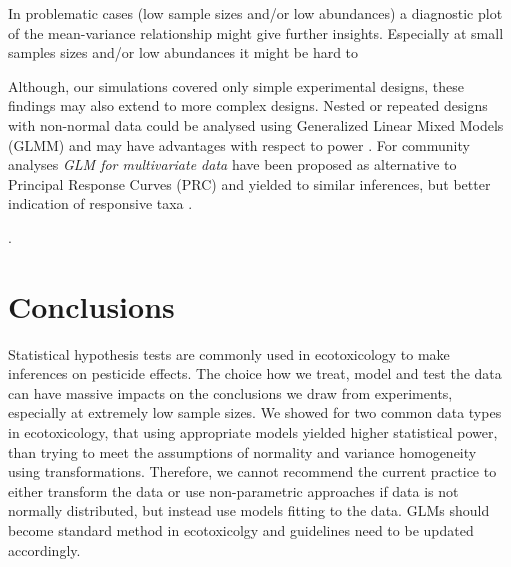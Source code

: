 \documentclass{scrartcl}
\begin{document}

In problematic cases (low sample sizes and/or low abundances) a diagnostic plot of the mean-variance relationship might give further insights.
Especially at small samples sizes and/or low abundances it might be hard to


Although, our simulations covered only simple experimental designs, these findings may also extend to more complex designs. 
Nested or repeated designs with non-normal data could be analysed using Generalized Linear Mixed Models (GLMM) and may have advantages with respect to power \citep{stroup_rethinking_2014}.
For community analyses \emph{GLM for multivariate data} have been proposed as alternative to Principal Response Curves (PRC) and yielded to similar inferences, but better indication of responsive taxa \citep{warton_distance-based_2012,szocs_analysing_2015}.





.







\newpage
\section{Conclusions}
Statistical hypothesis tests are commonly used in ecotoxicology to make inferences on pesticide effects.
The choice how we treat, model and test the data can have massive impacts on the conclusions we draw from experiments, especially at extremely low sample sizes.
We showed for two common data types in ecotoxicology, that using appropriate models yielded higher statistical power, than trying to meet the assumptions of normality and variance homogeneity using transformations. 
Therefore, we cannot recommend the current practice to either transform the data or use non-parametric approaches if data is not normally distributed, but instead use models fitting to the data. 
GLMs should become standard method in ecotoxicolgy and guidelines need to be updated accordingly.



\newpage


\end{document}
